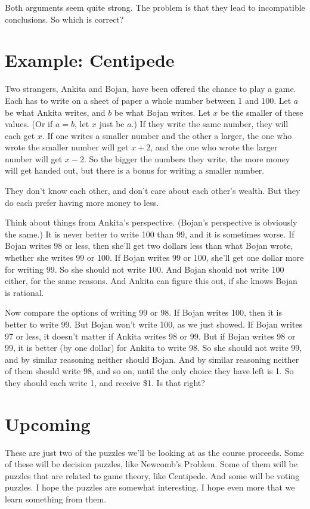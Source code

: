 Both arguments seem quite strong. The problem is that they lead to incompatible conclusions. So which is correct?

\section{Example: Centipede}
Two strangers, Ankita and Bojan, have been offered the chance to play a game. Each has to write on a sheet of paper a whole number between 1 and 100. Let $a$ be what Ankita writes, and $b$ be what Bojan writes. Let $x$ be the smaller of these values. (Or if $a = b$, let $x$ just be $a$.) If they write the same number, they will each get $x$. If one writes a smaller number and the other a larger, the one who wrote the smaller number will get $x+2$, and the one who wrote the larger number will get $x-2$. So the bigger the numbers they write, the more money will get handed out, but there is a bonus for writing a smaller number.

They don't know each other, and don't care about each other's wealth. But they do each prefer having more money to less.

Think about things from Ankita's perspective. (Bojan's perspective is obviously the same.) It is never better to write 100 than 99, and it is sometimes worse. If Bojan writes 98 or less, then she'll get two dollars less than what Bojan wrote, whether she writes 99 or 100. If Bojan writes 99 or 100, she'll get one dollar more for writing 99. So she should not write 100. And Bojan should not write 100 either, for the same reasons. And Ankita can figure this out, if she knows Bojan is rational. 

Now compare the options of writing 99 or 98. If Bojan writes 100, then it is better to write 99. But Bojan won't write 100, as we just showed. If Bojan writes 97 or less, it doesn't matter if Ankita writes 98 or 99. But if Bojan writes 98 or 99, it is better (by one dollar) for Ankita to write 98. So she should not write 99, and by similar reasoning neither should Bojan. And by similar reasoning neither of them should write 98, and so on, until the only choice they have left is 1. So they should each write 1, and receive \$1. Is that right?

\section{Upcoming}

\noindent These are just two of the puzzles we'll be looking at as the course proceeds. Some of these will be decision puzzles, like Newcomb's Problem. Some of them will be puzzles that are related to game theory, like Centipede. And some will be voting puzzles. I hope the puzzles are somewhat interesting. I hope even more that we learn something from them.